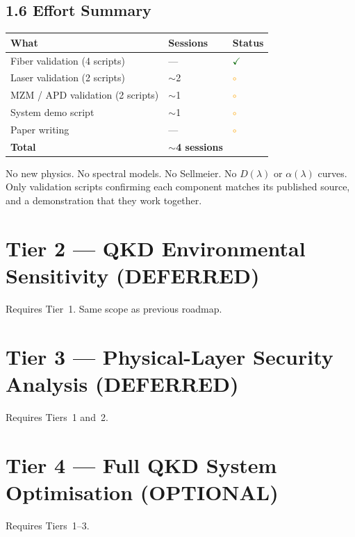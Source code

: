 \documentclass[11pt,a4paper]{article}
\newcommand{\done}{\textcolor{darkgreen}{$\checkmark$}}
\newcommand{\todo}{\textcolor{orange}{$\circ$}}
\begin{document}
\subsection{1.6  Effort Summary}

\begin{tabularx}{\textwidth}{L{3.5cm} L{2.5cm} L{4cm}}
\toprule
What & Sessions & Status \\
\midrule
Fiber validation (4 scripts) & --- & \done \\
Laser validation (2 scripts) & $\sim$2 & \todo \\
MZM / APD validation (2 scripts) & $\sim$1 & \todo \\
System demo script & $\sim$1 & \todo \\
Paper writing & --- & \todo \\
\midrule
\textbf{Total} & \textbf{$\sim$4 sessions} & \\
\bottomrule
\end{tabularx}

No new physics. No spectral models. No Sellmeier. No $D(\lambda)$ or
$\alpha(\lambda)$ curves. Only validation scripts confirming each component
matches its published source, and a demonstration that they work together.

\section{Tier 2 --- QKD Environmental Sensitivity (DEFERRED)}

Requires Tier~1. Same scope as previous roadmap.

\section{Tier 3 --- Physical-Layer Security Analysis (DEFERRED)}

Requires Tiers~1 and~2.

\section{Tier 4 --- Full QKD System Optimisation (OPTIONAL)}

Requires Tiers~1--3.

\end{document}
